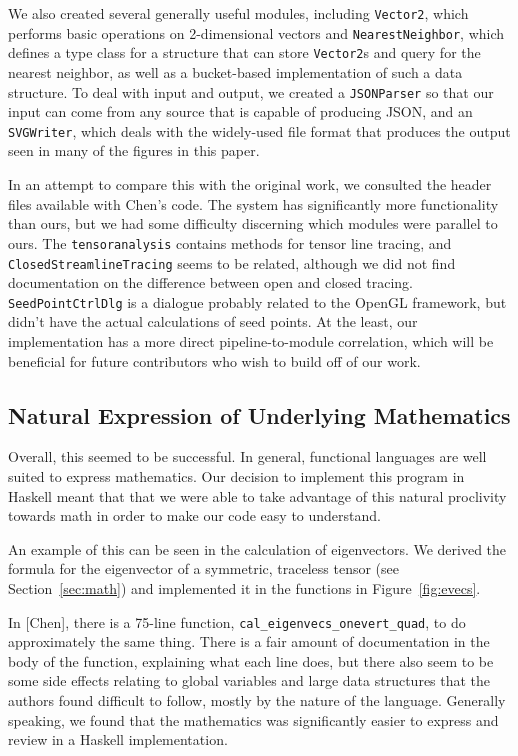 \documentclass[twocolumn]{article}
\begin{document}
We also created several generally useful modules, including \texttt{Vector2},
which performs basic operations on 2-dimensional vectors and
\texttt{NearestNeighbor}, which defines a type class for a structure that can
store \texttt{Vector2}s and query for the nearest neighbor, as well as a
bucket-based implementation of such a data structure. To deal with input and
output, we created a \texttt{JSONParser} so that our input can come from any
source that is capable of producing JSON, and an \texttt{SVGWriter}, which
deals with the widely-used file format that produces the output seen in many of
the figures in this paper.

In an attempt to compare this with the original work, we consulted the header
files available with Chen’s code. The system has significantly more
functionality than ours, but we had some difficulty discerning which modules
were parallel to ours. The \texttt{tensoranalysis} contains methods for tensor
line tracing, and \texttt{ClosedStreamlineTracing} seems to be related,
although we did not find documentation on the difference between open and
closed tracing. \texttt{SeedPointCtrlDlg} is a dialogue probably related to the
OpenGL framework, but didn’t have the actual calculations of seed points. At
the least, our implementation has a more direct pipeline-to-module correlation,
which will be beneficial for future contributors who wish to build off of our
work.

\subsection{Natural Expression of Underlying Mathematics}
Overall, this seemed to be successful. In general, functional languages are
well suited to express mathematics. Our decision to implement this program in
Haskell meant that that we were able to take advantage of this natural
proclivity towards math in order to make our code easy to understand.

An example of this can be seen in the calculation of eigenvectors. We derived
the formula for the eigenvector of a symmetric, traceless tensor
(see Section~\ref{sec:math}) and implemented it in the functions in
Figure~\ref{fig:evecs}.

In [Chen], there is a 75-line function,
\texttt{cal\_eigenvecs\_onevert\_quad}, to do approximately the same thing. There
is a fair amount of documentation in the body of the function, explaining what
each line does, but there also seem to be some side effects relating to global
variables and large data structures that the authors found difficult to follow,
mostly by the nature of the language.  Generally speaking, we found that the
mathematics was significantly easier to express and review in a Haskell
implementation.
\end{document}
